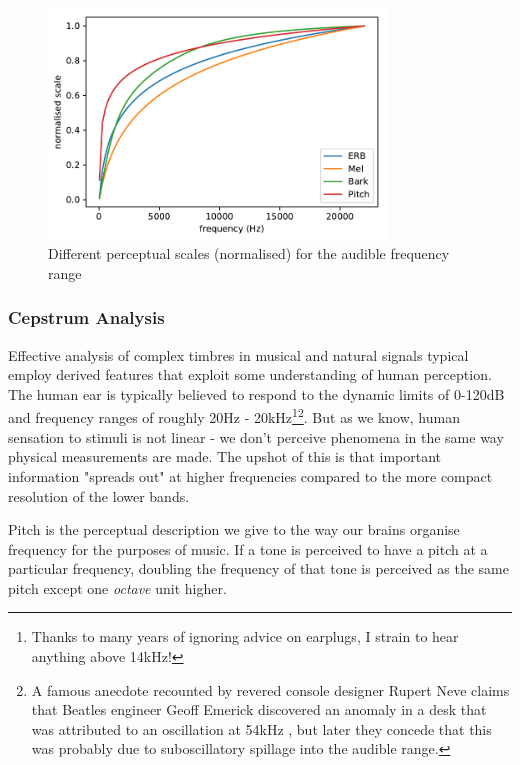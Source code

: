 {{\begin{figure}
	\begin{center}
		\includegraphics[width=0.8\textwidth]{ch05_pyconcat/figures/scale.pdf}
	\end{center}
	\caption[Perceptual Scales for Audible Range]{Different perceptual scales (normalised) for the audible frequency range}
	\label{fig:perceptual_scales}
\end{figure}


\subsubsection{Cepstrum Analysis}

Effective analysis of complex timbres in musical and natural signals typical employ derived features that exploit some understanding of human perception. The human ear is typically believed to respond to the dynamic limits of 0-120dB and frequency ranges of roughly 20Hz - 20kHz\footnote{Thanks to many years of ignoring advice on earplugs, I strain to hear anything above 14kHz!}\footnote{A famous anecdote recounted by revered console designer Rupert Neve claims that Beatles engineer Geoff Emerick discovered an anomaly in a desk that was attributed to an oscillation at 54kHz \citep{Winer2012}, but later they concede that this was probably due to suboscillatory spillage into the audible range.}. But as we know, human sensation to stimuli is not linear - we don't perceive phenomena in the same way physical measurements are made. The upshot of this is that important information "spreads out" at higher frequencies compared to the more compact resolution of the lower bands.

Pitch is the perceptual description we give to the way our brains organise frequency for the purposes of music. If a tone is perceived to have a pitch at a particular frequency, doubling the frequency of that tone is perceived as the same pitch except one \textit{octave} unit higher.

}}
